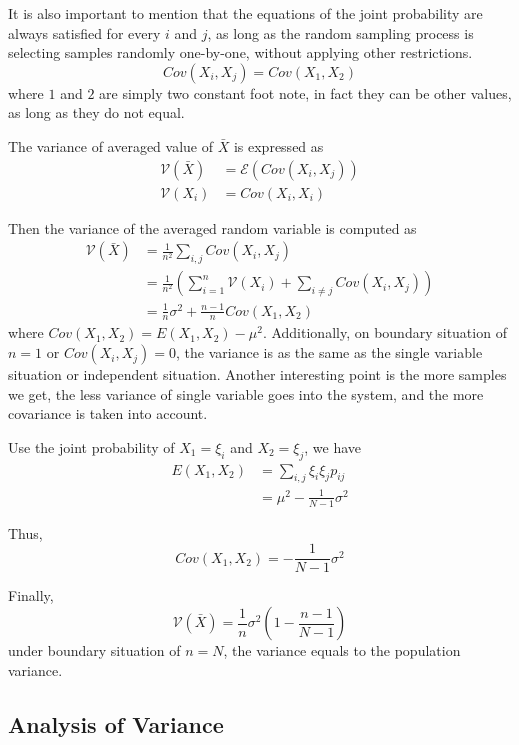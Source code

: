 It is also important to mention that the equations of the joint probability are always satisfied for every $i$ and $j$,
as long as the random sampling process is selecting samples randomly one-by-one, without applying other restrictions.
\begin{equation*}
    Cov(X_i, X_j) = Cov(X_1, X_2)
\end{equation*}
where $1$ and $2$ are simply two constant foot note,
in fact they can be other values,
as long as they do not equal.

The variance of averaged value of $\bar{X}$ is expressed as
\begin{align}
    \label{Equation: The Relationship between Variance and Covariance}
    \mathcal{V}(\bar{X}) & = \mathcal{E}(Cov(X_i, X_j)) \\
    \mathcal{V}(X_i)     & = Cov(X_i, X_i)
\end{align}

Then the variance of the averaged random variable is computed as
\begin{align*}
    \mathcal{V}({\bar{X}}) & = \frac{1}{n^2} \sum_{i, j} Cov(X_i, X_j)                                       \\
                           & = \frac{1}{n^2} (\sum_{i=1}^{n}\mathcal{V}(X_i) + \sum_{i \neq j}Cov(X_i, X_j)) \\
                           & = \frac{1}{n} \sigma^2 + \frac{n-1}{n} Cov(X_1, X_2)
\end{align*}
where $Cov(X_1, X_2) = E(X_1, X_2) - \mu^2$.
Additionally, on boundary situation of $n=1$ or $Cov(X_i, X_j)=0$,
the variance is as the same as the single variable situation or independent situation.
Another interesting point is the more samples we get,
the less variance of single variable goes into the system,
and the more covariance is taken into account.

Use the joint probability of $X_1=\xi_i$ and $X_2=\xi_j$, we have
\begin{align*}
    E(X_1, X_2) & = \sum_{i, j} \xi_i \xi_j p_{ij} \\
                & = \mu^2 - \frac{1}{N-1} \sigma^2
\end{align*}

Thus,
\begin{equation*}
    Cov(X_1, X_2) = - \frac{1}{N-1} \sigma^2
\end{equation*}

Finally,
\begin{equation*}
    \mathcal{V}(\bar{X})  = \frac{1}{n} \sigma^2 (1 - \frac{n-1}{N-1})
\end{equation*}
under boundary situation of $n=N$, the variance equals to the population variance.

\subsection{Analysis of Variance}

